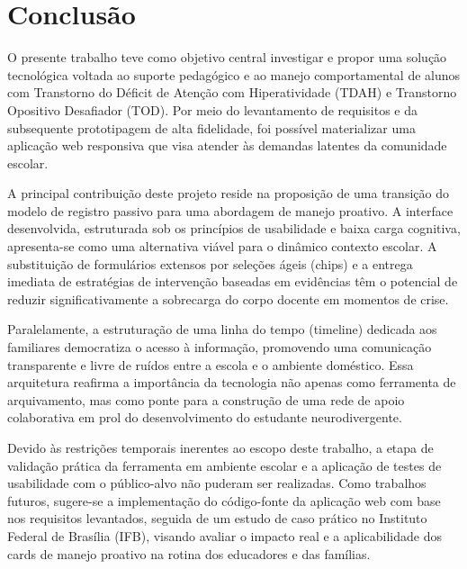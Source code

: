 \chapter{Conclusão}
\label{chap:conclusão}

O presente trabalho teve como objetivo central investigar e propor uma solução tecnológica voltada ao suporte pedagógico e ao manejo comportamental de alunos com Transtorno do Déficit de Atenção com Hiperatividade (TDAH) e Transtorno Opositivo Desafiador (TOD). Por meio do levantamento de requisitos e da subsequente prototipagem de alta fidelidade, foi possível materializar uma aplicação web responsiva que visa atender às demandas latentes da comunidade escolar.

A principal contribuição deste projeto reside na proposição de uma transição do modelo de registro passivo para uma abordagem de manejo proativo. A interface desenvolvida, estruturada sob os princípios de usabilidade e baixa carga cognitiva, apresenta-se como uma alternativa viável para o dinâmico contexto escolar. A substituição de formulários extensos por seleções ágeis (chips) e a entrega imediata de estratégias de intervenção baseadas em evidências têm o potencial de reduzir significativamente a sobrecarga do corpo docente em momentos de crise.

Paralelamente, a estruturação de uma linha do tempo (timeline) dedicada aos familiares democratiza o acesso à informação, promovendo uma comunicação transparente e livre de ruídos entre a escola e o ambiente doméstico. Essa arquitetura reafirma a importância da tecnologia não apenas como ferramenta de arquivamento, mas como ponte para a construção de uma rede de apoio colaborativa em prol do desenvolvimento do estudante neurodivergente.

Devido às restrições temporais inerentes ao escopo deste trabalho, a etapa de validação prática da ferramenta em ambiente escolar e a aplicação de testes de usabilidade com o público-alvo não puderam ser realizadas. Como trabalhos futuros, sugere-se a implementação do código-fonte da aplicação web com base nos requisitos levantados, seguida de um estudo de caso prático no Instituto Federal de Brasília (IFB), visando avaliar o impacto real e a aplicabilidade dos cards de manejo proativo na rotina dos educadores e das famílias.